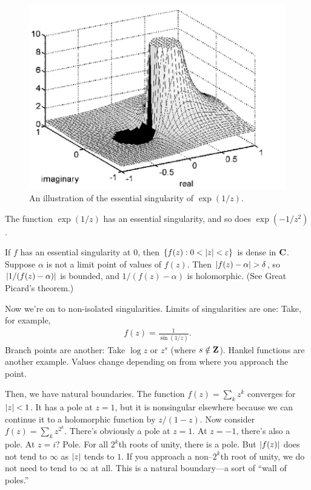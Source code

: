 \documentclass[11pt, oneside,margin=1in]{article}
\begin{document}
\begin{figure}
	\begin{center}
		\includegraphics[scale=0.6]{exp_z_inv}
		\caption{An illustration of the essential singularity of $\exp(1/z)$.}
	\end{center}
\end{figure}

The function $\exp(1/z)$ has an essential singularity, and so does $\exp(-1/z^2)$.

If $f$ has an essential singularity at $0$, then $\{f(z):0<\left \lvert z \right \rvert<\varepsilon\}$ is dense in $\mathbf C$. Suppose $\alpha$ is not a limit point of values of $f(z)$. Then $\left \lvert f(z)-\alpha \right \rvert > \delta$, so $\left \lvert 1/(f(z)-\alpha) \right \rvert$ is bounded, and $1/(f(z)-\alpha)$ is holomorphic. (See Great Picard's theorem.)

Now we're on to non-isolated singularities. Limits of singularities are one: Take, for example,
 \begin{align*}
	f(z) = \frac{1}{\sin (1/z)}.
\end{align*}
Branch points are another: Take $\log z$ or $z^s$ (where $s\notin \mathbf Z$). Hankel functions are another example. Values change depending on from where you approach the point.

Then, we have natural boundaries. The function $f(z) = \sum_k z^k$ converges for $\left \lvert z \right \rvert < 1$. It has a pole at $z=1$, but it is nonsingular elsewhere because we can continue it to a holomorphic function by $z/(1-z)$. Now consider $f(z) = \sum_k z^{2^k}$. There's obviously a pole at $z=1$. At $z=-1$, there's also a pole. At $z=i$? Pole. For all $2^k$th roots of unity, there is a pole. But $\left \lvert f(z) \right \rvert$ does not tend to $\infty$ as $\left \lvert z \right \rvert $ tends to $1$. If you approach a non--$2^k$th root of unity, we do not need to tend to $\infty$ at all. This is a natural boundary---a sort of ``wall of poles.''
\end{document}
